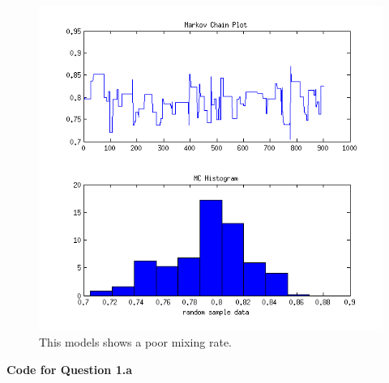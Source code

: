 \documentclass[12pt,a4paper]{article}
\begin{document}
\begin{figure}[ht!] 
\begin{center}
\includegraphics[scale=.7]{q1graph1.png}
\caption{This models shows a poor mixing rate.}
\label{q1fig1}
\end{center}
\end{figure}
\FloatBarrier
\clearpage
\textbf{Code for Question 1.a}\\
\end{document}
